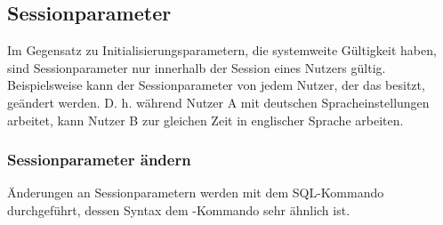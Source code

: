           \begin{literaturinternet}
            \item \cite{i2053602}
          \end{literaturinternet}
      \subsection{Sessionparameter}
        Im Gegensatz zu Initialisierungsparametern, die systemweite G\"ultigkeit haben, sind Sessionparameter nur innerhalb der Session eines Nutzers g\"ultig. Beispielsweise kann der Sessionparameter  von jedem Nutzer, der das  besitzt, ge\"andert werden. D. h. w\"ahrend Nutzer A mit deutschen Spracheinstellungen arbeitet, kann Nutzer B zur gleichen Zeit in englischer Sprache arbeiten.
        \subsubsection{Sessionparameter \"andern}
          \"Anderungen an Sessionparametern werden mit dem SQL-Kommando  durchgef\"uhrt, dessen Syntax dem -Kommando sehr \"ahnlich ist.

